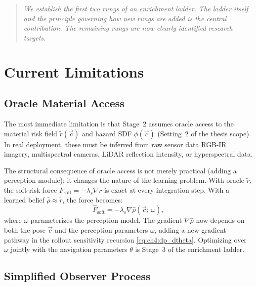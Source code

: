 \begin{quote}\itshape
We establish the first two rungs of an enrichment
ladder.
The ladder itself and the principle governing how new rungs are
added is the central contribution.
The remaining rungs are now clearly identified research targets.
\end{quote}

\section{Current Limitations}
\label{sec:ch7:limits}

\subsection{Oracle Material Access}
\label{subsec:ch7:oracle}

The most immediate limitation is that Stage~2 assumes oracle access
to the material risk field $\tilde{r}(\vec{c})$ and hazard SDF
$\phi(\vec{c})$ (Setting~2 of the thesis scope).
In real deployment, these must be inferred from raw sensor
data RGB-IR imagery, multispectral cameras, LiDAR reflection
intensity, or hyperspectral data.

The structural consequence of oracle access is not merely practical
(adding a perception module): it changes the nature of the learning
problem.
With oracle $\tilde{r}$, the soft-risk force $F_{\mathrm{soft}} =
-\lambda_s\nabla\tilde{r}$ is exact at every integration step.
With a learned belief $\hat\rho \approx \tilde{r}$, the force becomes:
\begin{equation}
  \hat{F}_{\mathrm{soft}}
  = -\lambda_s\nabla\hat\rho(\vec{c};\,\omega),
  \label{eq:ch7:approx_force}
\end{equation}
where $\omega$ parameterizes the perception model.
The gradient $\nabla\hat\rho$ now depends on both the pose $\vec{c}$
and the perception parameters $\omega$, adding a new gradient pathway
in the rollout sensitivity recursion \eqref{eq:ch4:dp_dtheta}.
Optimizing over $\omega$ jointly with the navigation parameters
$\theta$ is Stage~3 of the enrichment ladder.

\subsection{Simplified Observer Process}
\label{subsec:ch7:observer}

